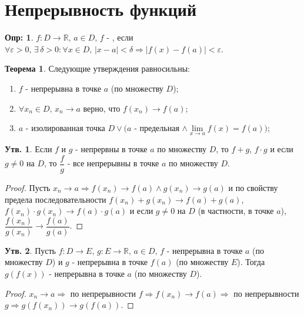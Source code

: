 \documentclass[12pt]{article}
\theoremstyle{definition}
\newtheorem{defn}{Опр:}
\newtheorem{prop}{Утв.}
\newtheorem{theorem}{Теорема}
\begin{document}

\section*{Непрерывность функций}

\begin{defn}
	$f \colon D \to \mathbb{R}, \, a \in D$, $f$ - , если \\
	$\forall \varepsilon > 0, \, \exists \, \delta > 0 \colon \forall x \in D, \, |x-a|  < \delta \Rightarrow |f(x) - f(a)| < \varepsilon$.
\end{defn}

\begin{theorem}
	Следующие утверждения равносильны:
	\begin{enumerate}[label={(\arabic*)}]
		\item $f$ - непрерывна в точке $a$ (по множеству $D$);
		\item $\forall x_n \in D, \, x_n \to a$ верно, что $f(x_n) \to f(a)$;
		\item $a$ - изолированная точка $D \vee (a$ - предельная $\wedge \lim\limits_{x\to a} f(x) = f(a))$;
	\end{enumerate}
\end{theorem}

\begin{prop}
	Если $f$ и $g$ - непрервны в точке $a$ по множеству $D$, то $f + g$, $f\cdot g$ и если $g \neq 0$ на $D$, то $\dfrac{f}{g}$ - все непрерывны в точке $a$ по множеству $D$. 
\end{prop}

\begin{proof}
	Пусть $x_n \to a \Rightarrow f(x_n) \to f(a) \wedge g(x_n) \to g(a)$ и по свойству предела последовательности $f(x_n) + g(x_n) \to f(a) + g(a)$, $f(x_n) \cdot g(x_n) \to f(a) \cdot g(a)$ и если $g \neq 0$ на $D$ (в частности, в точке $a$), $\dfrac{f(x_n)}{g(x_n)} \to \dfrac{f(a)}{g(a)}$.
\end{proof}
	
\begin{prop}
	Пусть $f \colon D \to E, \, g \colon E \to \mathbb{R}, \, a\in D, \, f$ - непрерывна в точке $a$ (по множеству $D$) и $g$ - непрерывна в точке $f(a)$ (по множеству $E$). Тогда $g(f(x))$ - непрерывна в точке $a$ (по множеству $D$).
\end{prop}

\begin{proof}
	$x_n \to a \Rightarrow$ по непрерывности $f \Rightarrow  f(x_n) \to f(a) \Rightarrow $ по непрерывности $g \Rightarrow g(f(x_n)) \to g(f(a))$.
\end{proof}	
\end{document}
